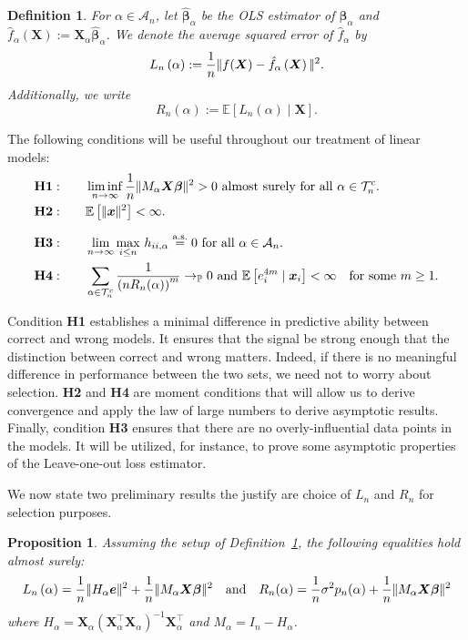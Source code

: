 \documentclass[11pt, letter paper]{article}
\newcommand{\1}{\mathmybb{1}}
\newtheorem{definition}{Definition}[section]
\newtheorem{proposition}{Proposition}[section]
\newcommand{\0}{\emptyset}
\newcommand{\prob}{\mathbb{P}}
\newcommand{\Ep}[1]{\mathbb{E}\left[ #1 \right]}
\newcommand{\paren}[1]{\left(#1 \right)}
\newcommand{\norm}[1]{|\hspace{-1pt}|#1 |\hspace{-1pt}|}
\newcommand{\normsq}[1]{\norm{#1}^{2}}
\newcommand{\Acal}{\mathcal{A}_{n}}
\newcommand{\Tcal}{\mathcal{T}_{n}}
\newcommand{\aseq}{\stackrel{\mathrm{a.s.}}{=}}
\newcommand{\X}{\boldsymbol{X}}
\newcommand{\x}{\boldsymbol{x}}
\newcommand{\e}{\boldsymbol{e}}
\newcommand{\bbeta}{\boldsymbol{\beta}}
\newcommand{\bbetahat}{\boldsymbol{\hat{\beta}}}
\newcommand{\Loss}[1]{L_{n}\paren{#1}}
\begin{document}
\begin{definition}\label{def:loss}
    For \(\alpha\in\Acal\), let \(\bbetahat_{\alpha}\) be the OLS estimator of \(\bbeta_{\alpha}\) and \(\hat{f}_{\alpha}(\X):=\X_{\alpha}\bbetahat_{\alpha}\). We denote the average squared error of \(\hat{f}_{\alpha}\) by
    \[\Loss{\alpha}:=\frac{1}{n}\normsq{f(\X) - \hat{f}_{\alpha}\paren{\X}}.\]
    Additionally, we write
    \[R_{n}(\alpha):= \Ep{\Loss{\alpha}\mid\X}.\]
\end{definition}

The following conditions will be useful throughout our treatment of linear models:
\begin{align*}
    &\mathbf{H1:}\qquad \liminf_{n\to\infty} \frac{1}{n}\normsq{M_{\alpha}\X\bbeta}>0 \text{ almost surely for all }\alpha \in\Tcal^{c}.\\
    &\mathbf{H2:} \qquad \Ep{\normsq{\x}}<\infty.\\[2.5mm]
    &\mathbf{H3:}\qquad \lim_{n\to\infty}\max_{i\leq n}\,h_{ii,\alpha} \aseq 0 \text{ for all }\alpha \in\Acal.\\
    &\mathbf{H4:}\qquad \sum_{\alpha\in\Tcal^{c}}\frac{1}{\paren{nR_{n}(\alpha)}^{m}}\to_{\prob}0\text{ and }\Ep{e_i^{4m}\mid\x_i}<\infty\quad\text{for some }m\geq 1.
\end{align*}

Condition \textbf{H1} establishes a minimal difference in predictive ability between correct and wrong models. It ensures that the signal be strong enough that the distinction between correct and wrong matters. Indeed, if there is no meaningful difference in performance between the two sets, we need not to worry about selection.
\textbf{H2} and \textbf{H4} are moment conditions that will allow us to derive convergence and apply the law of large numbers to derive asymptotic results.
Finally, condition \textbf{H3} ensures that there are no overly-influential data points in the models. It will be utilized, for instance, to prove some asymptotic properties of the Leave-one-out loss estimator.

We now state two preliminary results the justify are choice of \(L_{n}\) and \(R_{n}\) for selection purposes. 

\begin{proposition}\label{prop:lossshao}
    Assuming the setup of Definition~\ref{def:loss}, the following equalities hold almost surely:
    \[\Loss{\alpha} = \frac{1}{n}\normsq{H_{\alpha}\e} + \frac{1}{n}\normsq{M_{\alpha}\X\bbeta}\quad\text{and}\quad R_{n}(\alpha) = \frac{1}{n}\sigma^{2}p_{n}(\alpha) + \frac{1}{n}\normsq{M_{\alpha}\X\bbeta}\]
    where \(H_{\alpha} = \X_{\alpha}\paren{\X_{\alpha}^{\top}\X_{\alpha}}^{-1}\X_{\alpha}^{\top}\) and \(M_{\alpha}= I_{n} - H_{\alpha}\).
\end{proposition}
\end{document}
